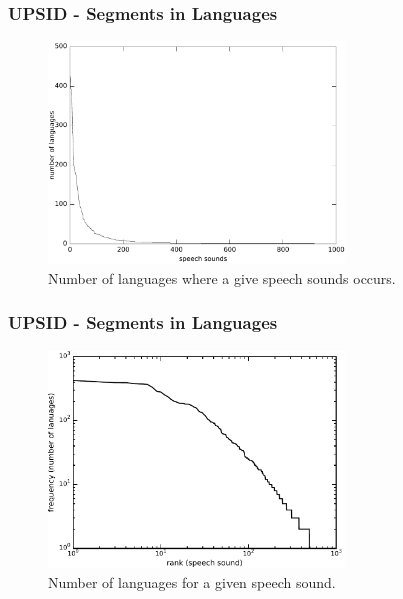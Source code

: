 \documentclass[notes]{beamer}
\begin{document}
\frame
{
  \frametitle{UPSID - Segments in Languages}
  
  \begin{figure}[h!]
  \centering
  \includegraphics[width=0.7\textwidth]{images/occ_of_speech_sounds_plot.pdf}
  \caption{Number of languages where a give speech sounds occurs.}
  \label{fig:occ_of_speech_sounds_plot}
  \end{figure}
}

\frame
{
  \frametitle{UPSID - Segments in Languages}

  \begin{figure}[h!]
  \centering
  \includegraphics[width=0.7\textwidth]{images/occ_of_speech_sounds_plotlog.pdf}
  \caption{Number of languages for a given speech sound.}
  \label{fig:occ_of_speech_sounds_plotlog}
  \end{figure}
}
\end{document}
